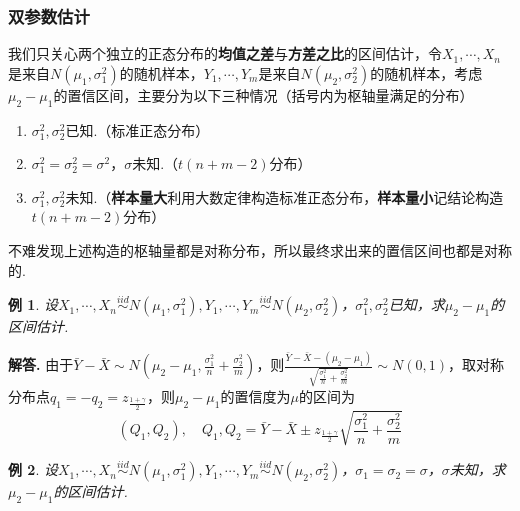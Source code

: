 \documentclass[12pt, a4paper, oneside]{ctexart}
\newtheorem{example}{例}[section]  %
\numberwithin{equation}{section}  %
\newenvironment{solution}[1][]{\par\noindent\textbf{#1解答. }}{\smallskip\par}  %
\def\del{\vspace{-1.5ex}}   %
\begin{document}
\subsubsection{双参数估计}
我们只关心两个独立的正态分布的\textbf{均值之差}与\textbf{方差之比}的区间估计，令$X_1,\cdots,X_n$是来自$N(\mu_1,\sigma_1^2)$的随机样本，$Y_1,\cdots,Y_m$是来自$N(\mu_2,\sigma_2^2)$的随机样本，考虑$\mu_2-\mu_1$的置信区间，主要分为以下三种情况（括号内为枢轴量满足的分布）
\begin{enumerate}[label=(\arabic*)]
    \item $\sigma_1^2,\sigma_2^2$已知.（标准正态分布）
    \item $\sigma_1^2=\sigma_2^2=\sigma^2$，$\sigma$未知.（$t(n+m-2)$分布）
    \item $\sigma_1^2,\sigma_2^2$未知.（\textbf{样本量大}利用大数定律构造标准正态分布，\textbf{样本量小}记结论构造$t(n+m-2)$分布）
\end{enumerate}
不难发现上述构造的枢轴量都是对称分布，所以最终求出来的置信区间也都是对称的.
\begin{example}
    设$X_1,\cdots,X_n\overset{iid}{\sim}N(\mu_1,\sigma_1^2),Y_1,\cdots,Y_m\overset{iid}{\sim}N(\mu_2,\sigma_2^2)$，$\sigma_1^2,\sigma_2^2$已知，求$\mu_2-\mu_1$的区间估计.
\end{example}
\begin{solution}
    由于$\bar{Y}-\bar{X}\sim N\left(\mu_2-\mu_1,\frac{\sigma_1^2}{n}+\frac{\sigma_2^2}{m}\right)$，则$\frac{\bar{Y}-\bar{X}-(\mu_2-\mu_1)}{\sqrt{\frac{\sigma_1^2}{n}+\frac{\sigma_2^2}{m}}}\sim N(0,1)$，取对称分布点$q_1=-q_2=z_{\frac{1+\gamma}{2}}$，则$\mu_2-\mu_1$的置信度为$\mu$的区间为
    \begin{equation*}
        (Q_1,Q_2),\quad Q_1,Q_2=\bar{Y}-\bar{X}\pm z_{\frac{1+\gamma}{2}}\sqrt{\frac{\sigma_1^2}{n}+\frac{\sigma_2^2}{m}}
    \end{equation*}\del\del
\end{solution}
\begin{example}
    设$X_1,\cdots,X_n\overset{iid}{\sim}N(\mu_1,\sigma_1^2),Y_1,\cdots,Y_m\overset{iid}{\sim}N(\mu_2,\sigma_2^2)$，$\sigma_1=\sigma_2=\sigma$，$\sigma$未知，求$\mu_2-\mu_1$的区间估计.
\end{example}
\end{document}
